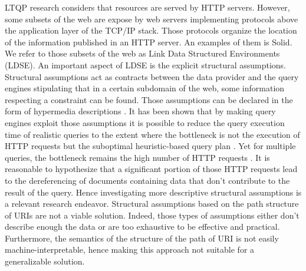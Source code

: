 LTQP research considers that resources are served by HTTP servers.
However, some subsets of the web are expose by web servers implementing protocols above the application layer of the TCP/IP stack.
Those protocols organize the location of the information published in an HTTP server.
An examples of them is Solid.
We refer to those subsets of the web as Link Data Structured Environments (LDSE).
An important aspect of LDSE is the explicit structural assumptions.
Structural assumptions act as contracts between the data provider and 
the query engines stipulating that in a certain subdomain of the web, some information respecting a constraint can be found.
Those assumptions can be declared in the form of hypermedia descriptions \cite{Fielding}.
It has been shown that by making query engines exploit those assumptions it is possible to reduce the query execution time
of realistic queries to the extent where the bottleneck is not the execution of 
HTTP requests but the suboptimal heuristic-based query plan \cite{eschauzier_quweda_2023, Taelman2023}.
Yet for multiple queries, the bottleneck remains the high number of HTTP requests  \cite{eschauzier_quweda_2023}.
It is reasonable to hypothesize that a significant portion of those HTTP requests lead to the dereferencing of
documents containing data that don't contribute to the result of the query.
Hence investigating more descriptive structural assumptions is a relevant research endeavor.
Structural assumptions based on the path structure of URIs are not a viable solution. 
Indeed, those types of assumptions either don't describe enough the data or are too exhaustive to be effective and practical.
Furthermore, the semantics of the structure of the path of URI is not easily machine-interpretable, hence 
making this approach not suitable for a generalizable solution.

